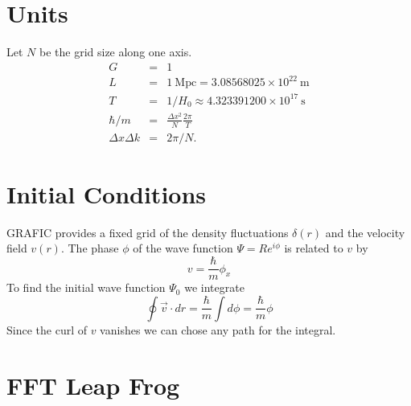 \documentclass{article}
\newcommand{\U}[1]{\ensuremath{\mathrm{\ #1}}}
\begin{document}
\section{Units}
Let $N$ be the grid size along one axis.
\begin{equation}
\begin{array}{ccl}
G &=& 1 \\
L &=& 1\U{Mpc} = 3.08568025\times 10^{22}\U{m} \\
T &=& 1/H_0 \approx 4.323391200\times 10^{17}\U{s} \\
\hbar/m &=& \frac{\Delta x^2}{N}\frac{2\pi}{T} \\
\Delta x \Delta k &=& 2\pi / N. 
\end{array}
\end{equation}

%

\section{Initial Conditions}

GRAFIC provides a fixed grid of the density fluctuations $\delta(r)$ and the
velocity field $v(r)$. The phase $\phi$ of the wave function $\Psi = R e^{i\phi}$
is related to $v$ by
\begin{equation}
v = \frac{\hbar}{m}\phi_x
\end{equation}
%
To find the initial wave function $\Psi_0$ we integrate
\begin{equation}
\oint \vec v \cdot dr = \frac{\hbar}{m}\int d\phi = \frac{\hbar}{m}\phi
\end{equation}
%
Since the curl of $v$ vanishes we can chose any path for the integral.

\section{FFT Leap Frog}
\end{document}
